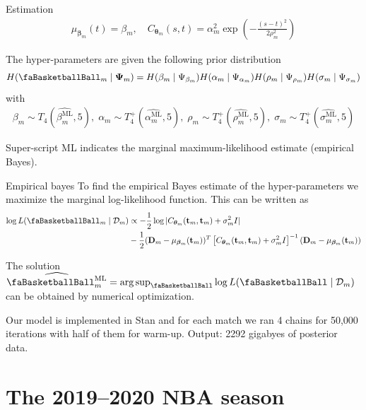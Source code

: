 \documentclass[ignorenonframetext,xcolor=pdflatex,table,dvipsnames,serif]{beamer}
\newcommand{\BTheta}{\text{\faBasketballBall}}
\DeclareMathOperator*{\argsup}{arg\,sup}
\begin{document}
\begin{frame}{Estimation}
\begin{align*}
  \mu_{\bm{\beta}_m}(t) = \beta_m, \quad C_{\bm{\theta}_m}(s, t) = \alpha^2_m\exp\left(-\frac{(s-t)^2}{2\rho^2_m}\right)
\end{align*}

The hyper-parameters are given the following prior distribution
\begin{align*}
H(\BTheta_m \mid \bm{\Psi}_m) = H(\beta_m \mid \Psi_{\beta_m})H(\alpha_m \mid \Psi_{\alpha_m})H(\rho_m \mid \Psi_{\rho_m})H(\sigma_m \mid \Psi_{\sigma_m})
\end{align*}
with
{
\footnotesize
\begin{align*}
\beta_{m} \sim T_4\left(\widehat{\beta_m^\text{ML}}, 5\right), \; \alpha_m \sim T^+_4\left(\widehat{\alpha_m^\text{ML}}, 5\right), \; \rho_m \sim T_4^+\left(\widehat{\rho_m^\text{ML}}, 5\right), \; \sigma_m \sim T^+_4\left(\widehat{\sigma_m^\text{ML}}, 5\right)
\end{align*}
} 

Super-script ML indicates the marginal maximum-likelihood estimate (empirical Bayes).
\end{frame}

\begin{frame}{Empirical bayes}
To find the empirical Bayes estimate of the hyper-parameters we maximize the marginal log-likelihood function. This can be written as
{
\footnotesize
\begin{align*}
\log L(\BTheta_m \mid \mathcal{D}_m) &\propto - \frac{1}{2}\log |C_{\bm{\theta}_m}(\mathbf{t}_m, \mathbf{t}_m) + \sigma_m^2 I|\\
&- \frac{1}{2}(\mathbf{D}_m - \mu_{\bm{\beta}_m}(\mathbf{t}_m))^T\left[C_{\bm{\theta}_m}(\mathbf{t}_m, \mathbf{t}_m) + \sigma_m^2 I\right]^{-1}(\mathbf{D}_m - \mu_{\bm{\beta}_m}(\mathbf{t}_m))
\end{align*}	
} 

The solution $\widehat{\BTheta_m^\text{ML}} = \argsup_{\BTheta} \log L(\BTheta \mid \mathcal{D}_m)$ can be obtained by numerical optimization.

Our model is implemented in Stan and for each match we ran 4 chains for 50,000 iterations with half of them for warm-up. Output: 2292 gigabyes of posterior data.
\end{frame}


\section{The 2019--2020 NBA season}
\end{document}

